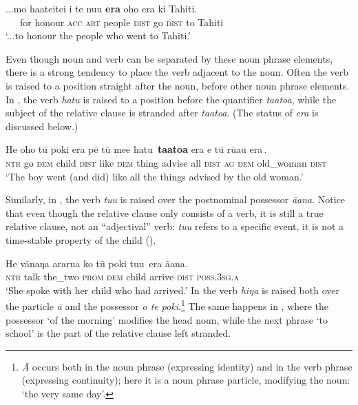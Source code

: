 \ea\label{ex:11.134}
\gll ...mo ha{\ꞌ}ateitei i te nu{\ꞌ}u \textbf{era} oho era ki Tahiti. \\
~~~for honour \textsc{acc} \textsc{art} people \textsc{dist} go \textsc{dist} to Tahiti \\

\glt 
‘...to honour the people who went to Tahiti.’ \textstyleExampleref{[R202.003]} 
\z

Even though noun and verb can be separated by these noun phrase elements, there is a strong tendency to place the verb adjacent to the noun. Often the verb is raised to a position straight after the noun, before other noun phrase elements. In , the verb \textit{hatu} is raised to a position before the quantifier \textit{ta{\ꞌ}ato{\ꞌ}a}, while the subject of the relative clause is stranded after \textit{ta{\ꞌ}ato{\ꞌ}a}. (The status of \textit{era} is discussed below.)

\ea\label{ex:11.135}
\gll He oho tū poki era pē tū me{\ꞌ}e {\ob}hatu\,{\cb} \textbf{ta{\ꞌ}ato{\ꞌ}a} era {\ob}e tū rū{\ꞌ}au era\,{\cb}.\\
\textsc{ntr} go \textsc{dem} child \textsc{dist} like \textsc{dem} thing {\db}advise all \textsc{dist} {\db}\textsc{ag} \textsc{dem} old\_woman \textsc{dist}\\

\glt
‘The boy went (and did) like all the things advised by the old woman.’ \textstyleExampleref{[R310.105]} 
\z

Similarly, in , the verb \textit{tu{\ꞌ}u} is raised over the postnominal possessor \textit{\mbox{{\ꞌ}ā{\ꞌ}ana}}. Notice that even though the relative clause only consists of a verb, it is still a true relative clause, not an “adjectival” verb: \textit{tu{\ꞌ}u} refers to a specific event, it is not a time-stable property of the child ().

\ea\label{ex:11.136}
\gll He vānaŋa ararua ko tū poki {\ob}tu{\ꞌ}u\,{\cb} era {\ꞌ}ā{\ꞌ}ana. \\
\textsc{ntr} talk the\_two \textsc{prom} \textsc{dem} child {\db}arrive \textsc{dist} \textsc{poss.3sg.a} \\

\glt
‘She spoke with her child who had arrived.’ \textstyleExampleref{[R532-01.007]}
\z
{}
In  the verb \textit{hiŋa} is raised both over the particle \textit{{\ꞌ}ā} and the possessor \textit{o te poki}.\footnote{\label{fn:518}\textit{{\ꞌ}Ā} occurs both in the noun phrase (expressing identity) and in the verb phrase (expressing continuity); here it is a noun phrase particle, modifying the noun: ‘the very same day’.} The same happens in , where the possessor ‘of the morning’ modifies the head noun, while the next phrase ‘to school’ is the part of the relative clause left stranded.

